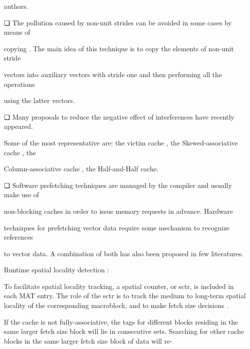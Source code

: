 \documentclass[12pt]{article}
\begin{document}
authors.\par

❏ The pollution caused by non-unit strides can be avoided in some cases by means of\par

copying . The main idea of this technique is to copy the elements of non-unit stride\par

vectors into auxiliary vectors with stride one and then performing all the operations\par

using the latter vectors.\par

❏ Many proposals to reduce the negative effect of interferences have recently appeared.\par

Some of the most representative are: the victim cache , the Skewed-associative cache , the\par

Column-associative cache , the Half-and-Half cache.\par

❏ Software prefetching techniques are managed by the compiler and usually make use of\par

non-blocking caches in order to issue memory requests in advance. Hardware\par

techniques for prefetching vector data require some mechanism to recognize references\par

to vector data. A combination of both has also been proposed in few literatures.\par

{\fontsize{16pt}{19.2pt}\selectfont Runtime spatial locality detection :\par}\par

To facilitate spatial locality tracking, a spatial counter, or sctr, is included in each MAT entry. The role of the sctr is to track the medium to long-term spatial locality of the corresponding macroblock, and to make fetch size decisions .{\fontsize{1pt}{1.2pt}\selectfont  \par}If the cache is not fully-associative, the tags for different blocks residing in the same larger fetch size block will lie in consecutive sets. Searching for other cache blocks in the same larger fetch size block of data will re-\par
\end{document}
